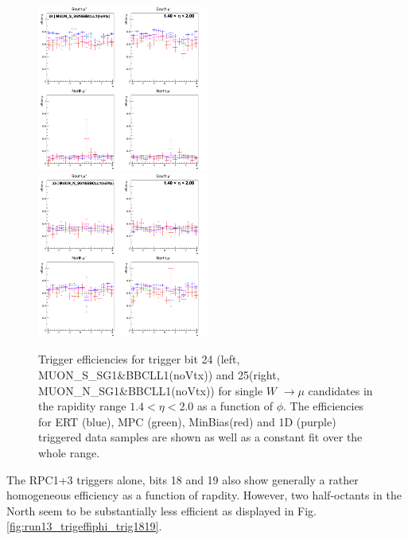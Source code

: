 \begin{figure}[h!]

  \centering
  \centering
  \includegraphics[width=0.5\textwidth]{./figures/run13_trigeffiphi_eta1_trig24_lin.png}
  \includegraphics[width=0.5\textwidth]{./figures/run13_trigeffiphi_eta1_trig25_lin.png}
  \caption{
    Trigger efficiencies for trigger bit 24 (left, MUON\_S\_SG1\&BBCLL1(noVtx))
    and 25(right, MUON\_N\_SG1\&BBCLL1(noVtx)) for single $W$ $\rightarrow \mu$
    candidates in the rapidity range $ 1.4 < \eta < 2.0$ as a function of $\phi$.
    The efficiencies for ERT (blue), MPC (green), MinBias(red) and 1D (purple)
    triggered data samples are shown as well as a constant fit over the whole
    range.
  }
  \label{fig:run13_trigeffiphi_trig2425} 
\end{figure}
\clearpage

The RPC1+3 triggers alone, bits 18 and 19 also show generally a rather
homogeneous efficiency as a function of rapdity. However, two half-octants in
the North seem to be substantially less efficient as displayed in Fig.~
\ref{fig:run13_trigeffiphi_trig1819}.  

